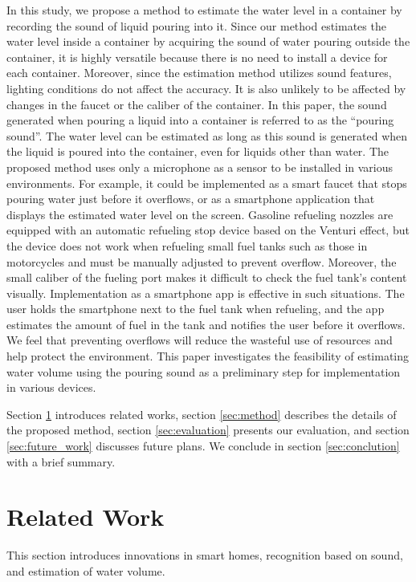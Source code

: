 \documentclass[manuscript,screen,anonymous,review]{acmart}
\begin{document}
In this study, we propose a method to estimate the water level in a container by recording the sound of liquid pouring into it. Since our method estimates the water level inside a container by acquiring the sound of water pouring outside the container, it is highly versatile because there is no need to install a device for each container. Moreover, since the estimation method utilizes sound features, lighting conditions do not affect the accuracy. It is also unlikely to be affected by changes in the faucet or the caliber of the container. In this paper, the sound generated when pouring a liquid into a container is referred to as the ``pouring sound''. The water level can be estimated as long as this sound is generated when the liquid is poured into the container, even for liquids other than water. The proposed method uses only a microphone as a sensor to be installed in various environments. For example, it could be implemented as a smart faucet that stops pouring water just before it overflows, or as a smartphone application that displays the estimated water level on the screen. Gasoline refueling nozzles are equipped with an automatic refueling stop device based on the Venturi effect, but the device does not work when refueling small fuel tanks such as those in motorcycles and must be manually adjusted to prevent overflow. Moreover, the small caliber of the fueling port makes it difficult to check the fuel tank's content visually. Implementation as a smartphone app is effective in such situations. The user holds the smartphone next to the fuel tank when refueling, and the app estimates the amount of fuel in the tank and notifies the user before it overflows. We feel that preventing overflows will reduce the wasteful use of resources and help protect the environment. This paper investigates the feasibility of estimating water volume using the pouring sound as a preliminary step for implementation in various devices.\par

Section \ref{sec:related} introduces related works, section \ref{sec:method} describes the details of the proposed method, section \ref{sec:evaluation} presents our evaluation, and section \ref{sec:future_work} discusses future plans. We conclude in section \ref{sec:conclution} with a brief summary.



\section{Related Work}
\label{sec:related}
This section introduces innovations in smart homes, recognition based on sound, and estimation of water volume.
\end{document}

